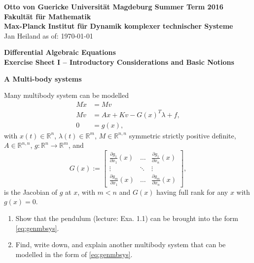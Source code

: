 \documentclass[a4paper,10pt]{article}
\begin{document}
{\bf Otto von Guericke Universit{\"a}t Magdeburg \hfill Summer Term 2016} \\
{\bf Fakult\"at f\"ur Mathematik} \\
{\bf Max-Planck Institut f\"ur Dynamik komplexer technischer Systeme} \\
Jan Heiland \hfill as of: \today \\


\bigskip
\begin{center}
\textbf{\large Differential Algebraic Equations}\\
\smallskip
\textbf{Exercise Sheet I -- Introductory Considerations and Basic Notions}\\
\end{center}

\bigskip

{\bf A Multi-body systems}

Many multibody system can be modelled
\begin{subequations}
	\label{eq:genmbsys}
	\begin{align}
		M\dot x &= M v \\
		M\dot v &= Ax + Kv - G(x)^T\lambda + f, \\
		0&= g(x),
	\end{align}
\end{subequations}
with $x(t)\in \mathbb R^{n}$, $\lambda(t)\in \mathbb R^{m}$, $M\in \mathbb R^{n,n} $ symmetric strictly positive definite, $A\in\mathbb R^{n,n}$, $g\colon \mathbb R^{n} \to \mathbb R^{m}$, and 
$$G(x):=
\begin{bmatrix}
	\frac{\partial g_1}{\partial x_1}(x) & \hdots & \frac{\partial g_1}{\partial x_n}(x) \\
	\vdots & \ddots & \vdots \\
	\frac{\partial g_m}{\partial x_1}(x) & \hdots & \frac{\partial g_m}{\partial x_n}(x)
\end{bmatrix},
$$
is the Jacobian of $g$ at $x$, with $m<n$ and $G(x)$ having full rank for any $x$ with $g(x)=0$.
\begin{enumerate}
	\item Show that the pendulum (lecture: Exa. 1.1) can be brought into the form \eqref{eq:genmbsys}.
	\item Find, write down, and explain another multibody system that can be modelled in the form of \eqref{eq:genmbsys}. 
\end{enumerate}

\bigskip
\end{document}
